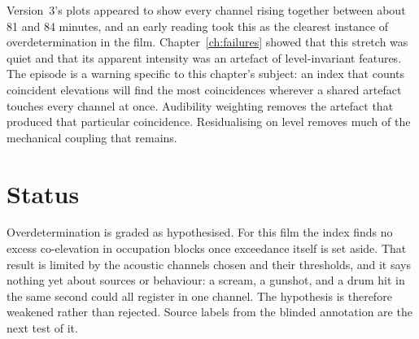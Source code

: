 Version~3's plots appeared to show every channel rising together between about 81 and 84 minutes, and an early reading took this as the clearest instance of overdetermination in the film. Chapter~\ref{ch:failures} showed that this stretch was quiet and that its apparent intensity was an artefact of level-invariant features. The episode is a warning specific to this chapter's subject: an index that counts coincident elevations will find the most coincidences wherever a shared artefact touches every channel at once. Audibility weighting removes the artefact that produced that particular coincidence. Residualising on level removes much of the mechanical coupling that remains.

\section{Status}

Overdetermination is graded as hypothesised. For this film the index finds no excess co-elevation in occupation blocks once exceedance itself is set aside. That result is limited by the acoustic channels chosen and their thresholds, and it says nothing yet about sources or behaviour: a scream, a gunshot, and a drum hit in the same second could all register in one channel. The hypothesis is therefore weakened rather than rejected. Source labels from the blinded annotation are the next test of it.
